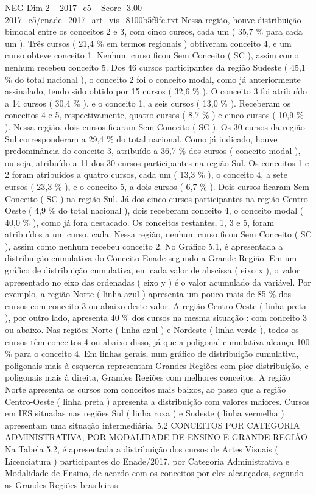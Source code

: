 \begin{textsample}{NEG Dim 2 – 2017\_c5 – Score -3.00 – 2017\_c5/enade\_2017\_art\_vis\_8100b5f9fc.txt}
Nessa região, houve distribuição bimodal entre os conceitos 2 e 3, com cinco cursos, cada um ( 35,7 \% para cada um ).
Três cursos ( 21,4 \% em termos regionais ) obtiveram conceito 4, e um curso obteve conceito 1.
Nenhum curso ficou Sem Conceito ( SC ), assim como nenhum recebeu conceito 5.
Dos 46 cursos participantes da região Sudeste ( 45,1 \% do total nacional ), o conceito 2 foi o conceito modal, como já anteriormente assinalado, tendo sido obtido por 15 cursos ( 32,6 \% ).
O conceito 3 foi atribuído a 14 cursos ( 30,4 \% ), e o conceito 1, a seis cursos ( 13,0 \% ).
Receberam os conceitos 4 e 5, respectivamente, quatro cursos ( 8,7 \% ) e cinco cursos ( 10,9 \% ).
Nessa região, dois cursos ficaram Sem Conceito ( SC ).
Os 30 cursos da região Sul corresponderam a 29,4 \% do total nacional.
Como já indicado, houve predominância do conceito 3, atribuído a 36,7 \% dos cursos ( conceito modal ), ou seja, atribuído a 11 dos 30 cursos participantes na região Sul.
Os conceitos 1 e 2 foram atribuídos a quatro cursos, cada um ( 13,3 \% ), o conceito 4, a sete cursos ( 23,3 \% ), e o conceito 5, a dois cursos ( 6,7 \% ).
Dois cursos ficaram Sem Conceito ( SC ) na região Sul.
Já dos cinco cursos participantes na região Centro-Oeste ( 4,9 \% do total nacional ), dois receberam conceito 4, o conceito modal ( 40,0 \% ), como já fora destacado.
Os conceitos restantes, 1, 3 e 5, foram atribuídos a um curso, cada.
Nessa região, nenhum curso ficou Sem Conceito ( SC ), assim como nenhum recebeu conceito 2.
No Gráfico 5.1, é apresentada a distribuição cumulativa do Conceito Enade segundo a Grande Região.
Em um gráfico de distribuição cumulativa, em cada valor de abscissa ( eixo x ), o valor apresentado no eixo das ordenadas ( eixo y ) é o valor acumulado da variável.
Por exemplo, a região Norte ( linha azul ) apresenta um pouco mais de 85 \% dos cursos com conceito 3 ou abaixo deste valor.
A região Centro-Oeste ( linha preta ), por outro lado, apresenta 40 \% dos cursos na mesma situação : com conceito 3 ou abaixo.
Nas regiões Norte ( linha azul ) e Nordeste ( linha verde ), todos os cursos têm conceitos 4 ou abaixo disso, já que a poligonal cumulativa alcança 100 \% para o conceito 4.
Em linhas gerais, num gráfico de distribuição cumulativa, poligonais mais à esquerda representam Grandes Regiões com pior distribuição, e poligonais mais à direita, Grandes Regiões com melhores conceitos.
A região Norte apresenta os cursos com conceitos mais baixos, ao passo que a região Centro-Oeste ( linha preta ) apresenta a distribuição com valores maiores.
Cursos em IES situadas nas regiões Sul ( linha roxa ) e Sudeste ( linha vermelha ) apresentam uma situação intermediária. 5.2 CONCEITOS POR CATEGORIA ADMINISTRATIVA, POR MODALIDADE DE ENSINO E GRANDE REGIÃO Na Tabela 5.2, é apresentada a distribuição dos cursos de Artes Visuais ( Licenciatura ) participantes do Enade/2017, por Categoria Administrativa e Modalidade de Ensino, de acordo com os conceitos por eles alcançados, segundo as Grandes Regiões brasileiras.

\end{textsample}
